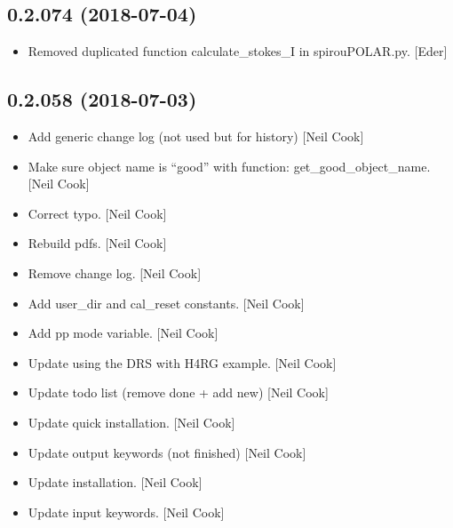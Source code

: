 \documentclass[a4paper,10pt,english]{report}
\begin{document}
\subsection{0.2.074 (2018-07-04)}
\label{\detokenize{misc/changelog:id401}}\begin{itemize}
\item {} 
Removed duplicated function calculate\_stokes\_I in spirouPOLAR.py.
{[}Eder{]}

\end{itemize}


\subsection{0.2.058 (2018-07-03)}
\label{\detokenize{misc/changelog:id402}}\begin{itemize}
\item {} 
Add generic change log (not used but for history) {[}Neil Cook{]}

\item {} 
Make sure object name is “good” with function: get\_good\_object\_name.
{[}Neil Cook{]}

\item {} 
Correct typo. {[}Neil Cook{]}

\item {} 
Rebuild pdfs. {[}Neil Cook{]}

\item {} 
Remove change log. {[}Neil Cook{]}

\item {} 
Add user\_dir and cal\_reset constants. {[}Neil Cook{]}

\item {} 
Add pp mode variable. {[}Neil Cook{]}

\item {} 
Update using the DRS with H4RG example. {[}Neil Cook{]}

\item {} 
Update todo list (remove done + add new) {[}Neil Cook{]}

\item {} 
Update quick installation. {[}Neil Cook{]}

\item {} 
Update output keywords (not finished) {[}Neil Cook{]}

\item {} 
Update installation. {[}Neil Cook{]}

\item {} 
Update input keywords. {[}Neil Cook{]}


\end{itemize}
\end{document}
